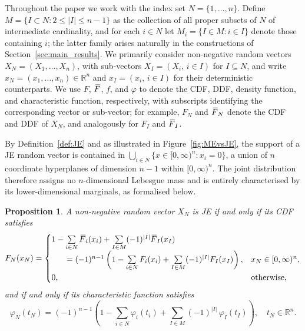 \documentclass[letterpaper,12pt]{article}
\def \RR {\mathbb{R}}
\numberwithin{equation}{section}
\newtheorem{proposition}[theorem]{Proposition}
\newcommand{\N}{{N}}
\newcommand{\M}{{M}}
\newcommand{\I}{{I}}
\newcommand{\F}{\,\overline{\kern-0.175em F\kern-0em}}
\begin{document}
{Throughout the paper we work with the index set $\N=\{1,\dots,n\}$. Define
$\M=\{\I\subset \N : 2\le |\I|\le n-1\}$ as the collection of all proper subsets
of $\N$ of intermediate cardinality, and for each $i\in\N$ let
$\M_i=\{\I\in \M : i\in \I\}$ denote those containing $i$; the latter family
arises naturally in the constructions of Section~\ref{sec:main_results}. We
primarily consider non-negative random vectors $X_{\N}=(X_1,\dots,X_n)$, with
sub-vectors $X_{\I}=(X_i,\,i\in\I)$ for $\I\subseteq \N$, and write
$x_{\N}=(x_1,\dots,x_n)\in\RR^n$ and $x_{\I}=(x_i,\,i\in\I)$ for their
deterministic counterparts. We use $F$, $\F$, $f$, and $\varphi$ to denote the
CDF, DDF, density function, and characteristic function, respectively, with
subscripts identifying the corresponding vector or sub-vector; for example,
$F_{\N}$ and $\F_{\N}$ denote the CDF and DDF of $X_{\N}$, and analogously for
$F_{\I}$ and $\F_{\I}$.

By Definition~\ref{def:JE} and as illustrated in Figure~\ref{fig:MEvsJE}, the
support of a JE random vector is contained in
$\bigcup_{i\in\N}\{x\in[0,\infty)^n : x_i=0\}$, a union of $n$ coordinate
hyperplanes of dimension $n-1$ within $[0,\infty)^n$. The joint distribution
therefore assigns no $n$-dimensional Lebesgue mass and is entirely characterised
by its lower-dimensional marginals, as formalised below.

\begin{proposition}
\label{prop:JECDF}
A non-negative random vector $X_{\N}$ is JE if and only if its CDF satisfies
\begin{equation}
\label{eq:JECDF}
F_{\N}(x_{\N})=\begin{cases}
1-\sum\limits_{i\in\N}\F_i(x_i)+\sum\limits_{\I\in\M}(-1)^{|\I|}\F_{\I}(x_{\I})\\[4pt]
\hspace*{0.65cm}=(-1)^{n-1}\left(1-\sum\limits_{i\in\N}F_i(x_i)
+\sum\limits_{\I\in\M}(-1)^{|\I|}F_{\I}(x_{\I})\right), & x_{\N}\in[0,\infty)^n, \\[8pt]
0, & \text{otherwise,}
\end{cases}
\end{equation}
and if and only if its characteristic function satisfies
\begin{equation}
\label{eq:JECF}
\varphi_{\N}(t_{\N})
= (-1)^{n-1}\left(1-\sum_{i\in\N}\varphi_i(t_i)
+\sum_{\I\in\M}(-1)^{|\I|}\,\varphi_{\I}(t_{\I})\right),
\quad t_{\N}\in\RR^n.
\end{equation}
\end{proposition}

}
\end{document}
